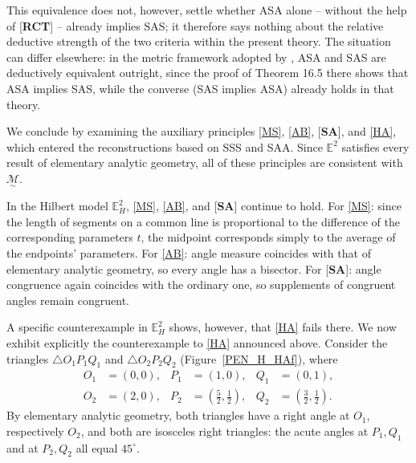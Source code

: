 \documentclass[11pt,a4paper]{article}
\theoremstyle{definition}
\theoremstyle{remark}
\numberwithin{equation}{section}
\newcommand{\MG}{\underset{\sim}{\mathcal{M}}} %
\begin{document}
This equivalence does not, however, settle whether ASA alone -- without the help of
[\textbf{RCT}] -- already implies SAS; it therefore says nothing about the relative deductive
strength of the two criteria within the present theory. The situation can differ elsewhere: in
the metric framework adopted by \cite{Martin1982}, ASA and SAS are deductively equivalent outright,
since the proof of Theorem 16.5 there shows that ASA implies SAS, while the converse (SAS
implies ASA) already holds in that theory.

We conclude by examining the auxiliary principles \ref{MS}, \ref{AB}, [\textbf{SA}], and
\ref{HA}, which entered the reconstructions based on SSS and SAA. Since $\mathbb{E}^{2}$
satisfies every result of elementary analytic geometry, all of these principles are consistent
with $\MG$.

In the Hilbert model $\mathbb{E}_{H}^{2}$, \ref{MS}, \ref{AB}, and [\textbf{SA}] continue to
hold. For \ref{MS}: since the length of segments on a common line is proportional to the
difference of the corresponding parameters $t$, the midpoint corresponds simply to the average
of the endpoints' parameters. For \ref{AB}: angle measure coincides with that of elementary
analytic geometry, so every angle has a bisector. For [\textbf{SA}]: angle congruence again
coincides with the ordinary one, so supplements of congruent angles remain congruent.

A specific counterexample in $\mathbb{E}_{H}^{2}$ shows, however, that \ref{HA} fails there.
We now exhibit explicitly the counterexample to \ref{HA} announced above. Consider the
triangles $\triangle O_1P_1Q_1$ and $\triangle O_2P_2Q_2$ (Figure~\ref{PEN_H_HAf}), where
\begin{align*}
O_1&=(0,0), & P_1&=(1,0), & Q_1&=(0,1),\\
O_2&=(2,0), & P_2&=\left(\tfrac52,\tfrac12\right), & Q_2&=\left(\tfrac32,\tfrac12\right).
\end{align*}
By elementary analytic geometry, both triangles have a right angle at $O_1$, respectively
$O_2$, and both are isosceles right triangles: the acute angles at $P_1,Q_1$ and at $P_2,Q_2$
all equal $45^\circ$.
\end{document}
